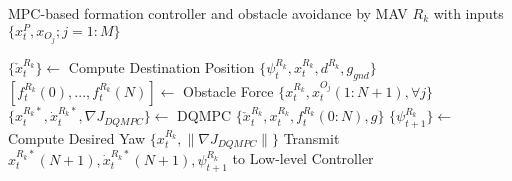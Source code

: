 \documentclass[12pt]{article}
\begin{document}
\begin{algorithm}
\caption{MPC-based formation controller and obstacle
avoidance by MAV $R_{k}$ with inputs $\{x_{t}^{P}, x_{O_{j}} ; j = 1 : M\}$}
\label{algo:framework}
\begin{algorithmic}[1]
\STATE $\{\check{x}_{t}^{R_{k}}\} \leftarrow$ Compute Destination Position $\{\psi_{t}^{R_{k}},{x}_{t}^{R_{k}},{d}^{R_{k}},g_{gnd}\}$
\label{code:step1}
\STATE $[{f}_{t}^{R_{k}}(0),...,{f}_{t}^{R_{k}}(N)] \leftarrow$ Obstacle Force $\{{x}_{t}^{R_{k}},{x}_{t}^{O_{j}}(1:N+1),\forall{j}\}$
\label{code:step2}
\STATE $\{{x}_{t}^{R_{k}*},{\dot{x}}_{t}^{R_{k}*},\nabla J_{DQMPC}\} \leftarrow$ DQMPC $\{{\check{x}}_{t}^{R_{k}},{x}_{t}^{R_{k}},{f}_{t}^{R_{k}}(0:N),g\}$
\label{code:step3}
\STATE $\{{\psi}_{t+1}^{R_{k}}\} \leftarrow$ Compute Desired Yaw $\{{x}_{t}^{R_{k}},\lVert {\nabla J_{DQMPC}}\rVert \}$
\label{code:step4}
\STATE Transmit ${x}_{t}^{R_{k}*}(N+1), {\dot{x}}_{t}^{R_{k}*}(N+1),{\psi}_{t+1}^{R_{k}}$ to Low-level Controller
\label{code:step5}
\end{algorithmic}
\end{algorithm}
\end{document}
